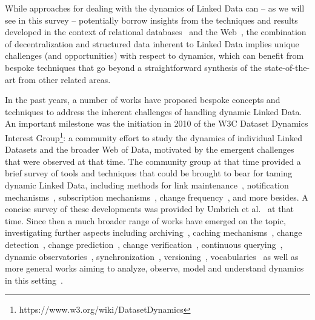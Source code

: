 \documentclass[sw]{iosart2x}
\begin{document}
While approaches for dealing with the dynamics of Linked Data can -- as we will see in this survey -- potentially borrow insights from the techniques and results developed in the context of relational databases~\cite{LernerH90,Roddick95,GuptaM95} and the Web~\cite{ChoG00,GaddeCR01,RisvikM02,ChoG03,AlmeidaMC07}, the combination of decentralization and structured data inherent to Linked Data implies unique challenges (and opportunities) with respect to dynamics, which can benefit from bespoke techniques that go beyond a straightforward synthesis of the state-of-the-art from other related areas.
\medskip

In the past years, a number of works have proposed bespoke concepts and techniques to address the inherent challenges of handling dynamic Linked Data. An important milestone was the initiation in 2010 of the W3C Dataset Dynamics Interest Group\footnote{https://www.w3.org/wiki/DatasetDynamics}: a community effort to study the dynamics of individual Linked Datasets and the broader Web of Data, motivated by the emergent challenges that were observed at that time. The community group at that time provided a brief survey of tools and techniques that could be brought to bear for taming dynamic Linked Data, including methods for link maintenance~\cite{PopitschH10,PopitschH11}, notification mechanisms~\cite{TrampFEA10}, subscription mechanisms~\cite{Fitzpatrick10,PassantM10}, change frequency~\cite{UmbrichHHPD10}, and more besides. A concise survey of these developments was provided by Umbrich et al.~\cite{UmbrichVH10} at that time. Since then a much broader range of works have emerged on the topic, investigating further aspects including archiving~\cite{UmbrichMP15}, caching mechanisms~\cite{MartinUA10,LampoVDR11,UmbrichKHP12,DehghanzadehPKUHD14,DividinoGS15,Kjernsmo15,ZhangSTQ15,NishiokaS17,dehghanzadeh2017}, change detection~\cite{ZeginisTC11,PapavasileiouFFKC13,DividinoKG14,PernelleSMT16}, change prediction~\cite{GonzalezH18,LoustaunauH19}, change verification~\cite{NishiokaS18}, continuous querying~\cite{DehghanzadehDGV15}, dynamic observatories~\cite{KaferUHP12}, synchronization~\cite{KnuthHS16,TummarelloMBE07}, versioning~\cite{GraubeHU14}, vocabularies~\cite{Berners04,Dady10} as well as more general works aiming to analyze, observe, model and understand dynamics in this setting~\cite{RulaPHSM12,DividinoSGG13,KaferAUOH13,DividinoGSG14,KaferWA17,NishiokaS15,NishiokaS16}.

\end{document}
